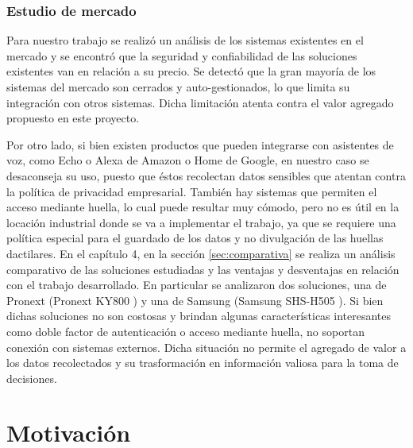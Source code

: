 \subsubsection{Estudio de mercado}

Para nuestro trabajo se realizó un análisis de los sistemas existentes en el mercado y se encontró que la seguridad y confiabilidad de las soluciones existentes van en relación a su precio. Se detectó que la gran mayoría de los sistemas del mercado son cerrados y auto-gestionados, lo que limita su integración con otros sistemas. Dicha limitación atenta contra el valor agregado propuesto en este proyecto.

Por otro lado, si bien existen productos que pueden integrarse con asistentes de voz, como Echo o Alexa de Amazon o Home de Google, en nuestro caso se desaconseja su uso, puesto que éstos recolectan datos sensibles que atentan contra la política de privacidad empresarial. También hay sistemas que permiten el acceso mediante huella, lo cual puede resultar muy cómodo, pero no es útil en la locación industrial donde se va a implementar el trabajo, ya que se requiere una política especial para el guardado de los datos y no divulgación de las huellas dactilares. En el capítulo 4, en la sección \ref{sec:comparativa} se realiza un análisis comparativo de las soluciones estudiadas y las ventajas y desventajas en relación con el trabajo desarrollado. En particular se analizaron dos soluciones, una de Pronext (Pronext KY800 \citep{WEBSITE:Ponext}) y una de Samsung (Samsung SHS-H505 \citep{WEBSITE:Samsung}). Si bien dichas soluciones no son costosas y brindan algunas características interesantes como doble factor de autenticación
o acceso mediante huella, no soportan conexión con sistemas externos. Dicha situación no permite el agregado de valor a los datos recolectados y su trasformación en información valiosa para la toma de decisiones.



\section{Motivación}

